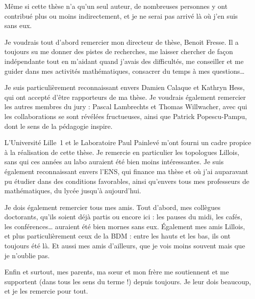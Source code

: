 

Même si cette thèse n'a qu'un seul auteur, de nombreuses personnes y ont contribué plus ou moins indirectement, et je ne serai pas arrivé là où j'en suis sans eux.

Je voudrais tout d'abord remercier mon directeur de thèse, Benoit Fresse.
Il a toujours su me donner des pistes de recherches, me laisser chercher de façon indépendante tout en m'aidant quand j'avais des difficultés, me conseiller et me guider dans mes activités mathématiques, consacrer du temps à mes questions\dots{}

Je suis particulièrement reconnaissant envers Damien Calaque et Kathryn Hess, qui ont accepté d'être rapporteurs de ma thèse.
Je voudrais également remercier  les autres membres du jury : Pascal Lambrechts et Thomas Willwacher, avec qui les collaborations se sont révélées fructueuses, ainsi que Patrick Popescu-Pampu, dont le sens de la pédagogie inspire.

L'Université Lille~1 et le Laboratoire Paul Painlevé m'ont fourni un cadre propice à la réalisation de cette thèse.
Je remercie en particulier les topologues Lillois, sans qui ces années au labo auraient été bien moins intéressantes.
Je suis également reconnaissant envers l'ENS, qui finance ma thèse et où j'ai auparavant pu étudier dans des conditions favorables, ainsi qu'envers tous mes professeurs de mathématiques, du lycée jusqu'à aujourd'hui.

Je dois également remercier tous mes amis.
Tout d'abord, mes collègues doctorants, qu'ils soient déjà partis ou encore ici : les pauses du midi, les cafés, les conférences\dots{} auraient été bien mornes sans eux.
Également mes amis Lillois, et plus particulièrement ceux de la BDM : entre les hauts et les bas, ils ont toujours été là.
Et aussi mes amis d'ailleurs, que je vois moins souvent mais que je n'oublie pas.

Enfin et surtout, mes parents, ma sœur et mon frère me soutiennent et me supportent (dans tous les sens du terme !) depuis toujours.
Je leur dois beaucoup, et je les remercie pour tout.

